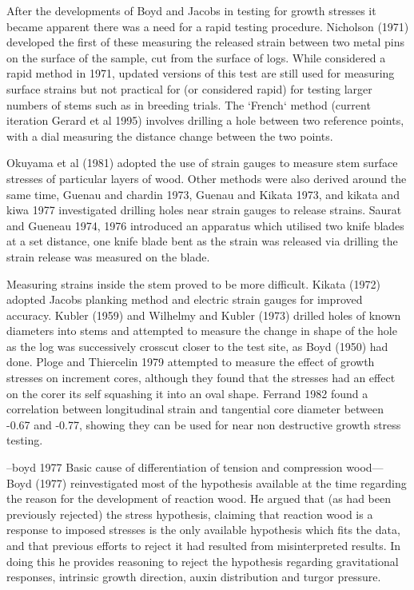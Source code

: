 \documentclass{article}
\begin{document}
After the developments of Boyd and Jacobs in testing for growth stresses it
became apparent there was a need for a rapid testing procedure. Nicholson (1971)
developed the first of these measuring the released strain between two metal pins
on the surface of the sample, cut from the surface of logs. While considered a
rapid method in 1971, updated versions of this test are still used for measuring
surface strains but not practical for (or considered rapid) for testing larger
numbers of stems such as in breeding trials. The `French` method (current
iteration Gerard et al 1995) involves drilling a hole between two reference
points, with a dial measuring the distance change between the two points.

Okuyama et al (1981) adopted the use of strain gauges to measure stem surface
stresses of particular layers of wood. Other methods were also derived around
the same time, Guenau and chardin 1973, Guenau and Kikata 1973, and kikata and
kiwa 1977 investigated drilling holes near strain gauges to release strains.
Saurat and Gueneau 1974, 1976 introduced an apparatus which utilised two knife
blades at a set distance, one knife blade bent as the strain was released via
drilling the strain release was measured on the blade.

Measuring strains inside the stem proved to be more difficult. Kikata (1972)
adopted Jacobs planking method and electric strain gauges for improved accuracy.
Kubler (1959) and Wilhelmy and Kubler (1973) drilled holes of known diameters into stems and
attempted to measure the change in shape of the hole as the log was successively
crosscut closer to the test site, as Boyd (1950) had done. Ploge and Thiercelin
1979 attempted to measure the effect of growth stresses on increment cores,
although they found that the stresses had an effect on the corer its self
squashing it into an oval shape. Ferrand 1982 found a correlation between
longitudinal strain and tangential core diameter between -0.67 and -0.77, showing
they can be used for near non destructive growth stress testing.

 --boyd 1977 Basic cause of differentiation of tension and
compression wood--- Boyd (1977) reinvestigated most of the hypothesis available at the time
regarding the reason for the development of reaction wood. He argued that (as
had been previously rejected) the stress hypothesis, claiming that reaction wood
is a response to imposed stresses is the only available hypothesis which fits
the data, and that previous efforts to reject it had resulted from
misinterpreted results. In doing this he provides reasoning to reject the
hypothesis regarding gravitational responses, intrinsic growth direction, auxin
distribution and turgor pressure.
\end{document}
